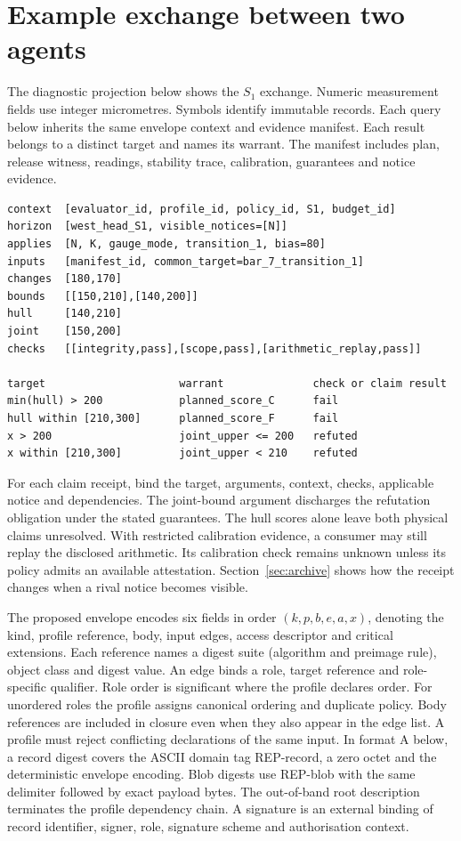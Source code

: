 \documentclass[11pt,a4paper]{article}
\newcommand{\partpage}[1]{\clearpage\section{#1}}
\newcommand{\topic}[1]{\par\smallskip{\sffamily\bfseries\color{ink}#1\par}\nobreak}
\begin{document}
\appendix
\partpage{Example exchange between two agents}\label{app:exchange}
The diagnostic projection below shows the $S_1$ exchange. Numeric measurement fields use integer micrometres. Symbols identify immutable records. Each query below inherits the same envelope context and evidence manifest. Each result belongs to a distinct target and names its warrant. The manifest includes plan, release witness, readings, stability trace, calibration, guarantees and notice evidence.

\begin{small}
\begin{verbatim}
context  [evaluator_id, profile_id, policy_id, S1, budget_id]
horizon  [west_head_S1, visible_notices=[N]]
applies  [N, K, gauge_mode, transition_1, bias=80]
inputs   [manifest_id, common_target=bar_7_transition_1]
changes  [180,170]
bounds   [[150,210],[140,200]]
hull     [140,210]
joint    [150,200]
checks   [[integrity,pass],[scope,pass],[arithmetic_replay,pass]]

target                     warrant              check or claim result
min(hull) > 200            planned_score_C      fail
hull within [210,300]      planned_score_F      fail
x > 200                    joint_upper <= 200   refuted
x within [210,300]         joint_upper < 210    refuted
\end{verbatim}
\end{small}

For each claim receipt, bind the target, arguments, context, checks, applicable notice and dependencies. The joint-bound argument discharges the refutation obligation under the stated guarantees. The hull scores alone leave both physical claims unresolved. With restricted calibration evidence, a consumer may still replay the disclosed arithmetic. Its calibration check remains unknown unless its policy admits an available attestation. Section~\ref{sec:archive} shows how the receipt changes when a rival notice becomes visible.

\topic{Minimum behaviour for exchanging records}
The proposed envelope encodes six fields in order $(k,p,b,e,a,x)$, denoting the kind, profile reference, body, input edges, access descriptor and critical extensions. Each reference names a digest suite (algorithm and preimage rule), object class and digest value. An edge binds a role, target reference and role-specific qualifier. Role order is significant where the profile declares order. For unordered roles the profile assigns canonical ordering and duplicate policy. Body references are included in closure even when they also appear in the edge list. A profile must reject conflicting declarations of the same input. In format A below, a record digest covers the ASCII domain tag REP-record, a zero octet and the deterministic envelope encoding. Blob digests use REP-blob with the same delimiter followed by exact payload bytes. The out-of-band root description terminates the profile dependency chain. A signature is an external binding of record identifier, signer, role, signature scheme and authorisation context.
\end{document}
